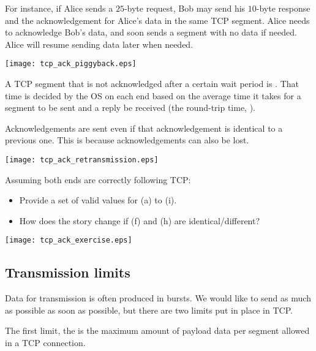For instance, if Alice sends a $25$-byte request, Bob may send his $10$-byte response
and the acknowledgement for Alice's data in the same TCP segment. Alice needs to acknowledge 
Bob's data, and soon sends a segment with no data if needed. Alice will resume sending 
data later when needed.

\begin{center}
\texttt{[image: tcp\_ack\_piggyback.eps]}
\end{center}

A TCP segment that is not acknowledged after a certain wait period is 
. That time is decided by the OS on each end
based on the average time it takes for a segment to be sent and a reply be received 
(the round-trip time, ).

Acknowledgements are sent even if that acknowledgement is identical to a previous one. This is because 
acknowledgements can also be lost.

\begin{center}
\texttt{[image: tcp\_ack\_retransmission.eps]}
\end{center}


\begin{exercise}
Assuming both ends are correctly following TCP:
\begin{itemize}
 \item Provide a set of valid values for (a) to (i).
 \item How does the story change if (f) and (h) are identical/different?
\end{itemize}

\begin{center}
\texttt{[image: tcp\_ack\_exercise.eps]}
\end{center}
\end{exercise}

\subsection{Transmission limits}

Data for transmission is often produced in bursts. We would like to send as much 
as possible as soon as possible, but there are two limits put in place in TCP.

The first limit, the  is the maximum amount of payload data
per segment allowed in a TCP connection. 

